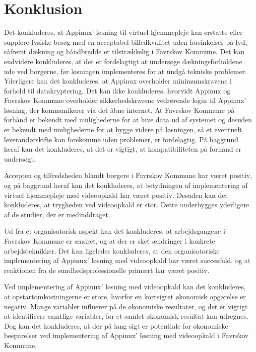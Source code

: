 \chapter{Konklusion}

Det konkluderes, at Appinux’ løsning til virtuel hjemmepleje kan erstatte eller supplere fysiske besøg med en acceptabel billedkvalitet uden forsinkelser på lyd, såfremt dækning og båndbredde er tilstrækkelig i Favrskov Kommune. Det kan endvidere konkluderes, at det er fordelagtigt at undersøge dækningsforholdene ude ved borgerne, før løsningen implementeres for at undgå tekniske problemer.
Yderligere kan det konkluderes, at Appinux overholder minimumskravene i forhold til datakryptering. Det kan ikke konkluderes, hvorvidt Appinux og Favrskov Kommune overholder sikkerhedskravene vedrørende login til Appinux' løsning, der kommunikerer via det åbne internet. 
At Favrskov Kommune på forhånd er bekendt med mulighederne for at hive data ud af systemet og desuden er bekendt med mulighederne for at bygge videre på løsningen, så et eventuelt leverandørskifte kan forekomme uden problemer, er fordelagtig. På baggrund heraf kan det konkluderes, at det er vigtigt, at kompatibiliteten på forhånd er undersøgt.

Accepten og tilfredsheden blandt borgere i Favrskov Kommune har været positiv, og på baggrund heraf kan det konkluderes, at betydningen af implementering af virtuel hjemmepleje med videoopkald har været positiv. Desuden kan det konkluderes, at trygheden ved videoopkald er stor. Dette underbygges yderligere af de studier, der er medinddraget.

Ud fra et organisatorisk aspekt kan det konkluderes, at arbejdsgangene i Favrskov Kommune er ændret, og at der er sket ændringer i konkrete arbejdsteknikker. 
Det kan ligeledes konkluderes, at den organisatoriske implementering af Appinux' løsning med videoopkald har været succesfuld, og at reaktionen fra de sundhedsprofessionelle primært har været positiv. 

Ved implementering af Appinux' løsning med videoopkald kan det konkluderes, at opstartomkostningerne er store, hvorfor en kortsigtet økonomisk opgørelse er negativ.
Mange variabler influerer på de økonomiske resultater, og det er vigtigt at identificere samtlige variabler, før et samlet økonomisk resultat kan udregnes. Dog kan det konkluderes, at der på lang sigt er potentiale for økonomiske besparelser ved implementering af Appinux' løsning med videoopkald i Favrskov Kommune.  






